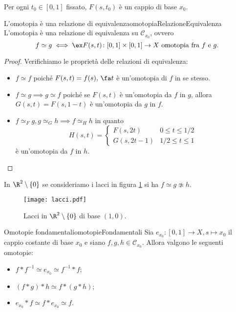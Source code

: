\begin{oss}
	Per ogni \(t_0\in [0,1]\) fissato, \(F(s,t_0)\) è un cappio di base \(x_0\).
\end{oss}
%
%
\begin{prop}{L'omotopia è una relazione di equivalenza}{omotopiaRelazioneEquivalenza}
	L'omotopia è una relazione di equivalenza su \(\mathcal{C}_{x_0}\), ovvero
	\[
		f \simeq g \iff \ex F(s,t) \colon [0,1]\times [0,1] \to X \text{ omotopia fra \(f\) e \(g\)}.
	\]
\end{prop}

\begin{proof}
	Verifichiamo le proprietà delle relazioni di equivalenza:
	\begin{itemize}
		\item \(f \simeq f\) poiché \(F(s,t) = f(s),\,\fa t\) è un'omotopia di \(f\) in se stesso.
		\item \(f \simeq g \implies g \simeq f\) poiché se \(F(s,t)\) è un'omotopia da \(f\) in \(g\), allora \(G(s,t) = F(s,1-t)\) è un'omotopia da \(g\) in \(f\).
		\item \(f \simeq_F g, g \simeq_G h \implies f \simeq_H h\) in quanto
		      \[
			      H(s,t) = 	\begin{cases}
				      F(s,2t)   & 0\le t \le 1/2  \\
				      G(s,2t-1) & 1/2\le  t \le 1
			      \end{cases}
		      \]
		      è un'omotopia da \(f\) in \(h\).
	\end{itemize}
\end{proof}

\begin{ese}
	In \(\R^2\setminus\{0\}\) se consideriamo i lacci in figura \ref{fig:lacci} si ha \(f \simeq g \not\simeq h\).
\end{ese}

\begin{figure}[tp]
	\begin{centering}
		\texttt{[image: lacci.pdf]}
		\caption{Lacci in \(\R^2\setminus\{0\}\) di base \((1,0)\).}
		\label{fig:lacci}
	\end{centering}
\end{figure}

\begin{teor}{Omotopie fondamentali}{omotopieFondamentali}
	Sia \(e_{x_0}\colon [0,1] \to X, s\mapsto x_0\) il cappio costante di base \(x_0\) e siano \(f,g,h \in \mathcal{C}_{x_0}\).
	Allora valgono le seguenti omotopie:
	\begin{itemize}
		\item \(f*f^{-1} \simeq e_{x_0} \simeq f^{-1}*f\);
		\item \((f*g) * h \simeq f * (g*h)\);
		\item \(e_{x_0} * f \simeq f * e_{x_0} \simeq f\).
	\end{itemize}
\end{teor}

